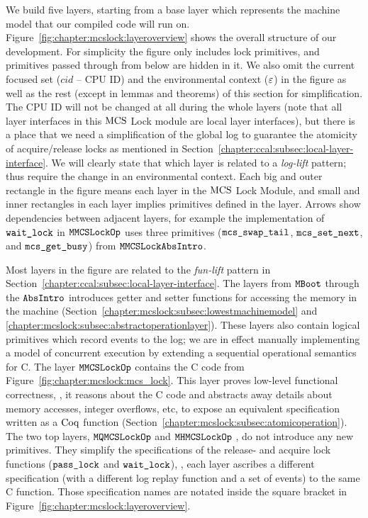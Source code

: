 We build five layers, starting from a base layer which represents the machine model that our compiled code will
run on.
Figure~\ref{fig:chapter:mcslock:layeroverview} shows the overall structure of our development.
For simplicity the figure only includes lock primitives, and
primitives passed through from below are hidden in it.
We also omit the current focused set ($cid$ -- CPU ID) and the environmental context (${\varepsilon}$) in the figure
 as well as the rest (except in lemmas and theorems) of this section for simplification.
The CPU ID will not be changed at all during the whole layers (note that all  layer interfaces in this $\mathrm{MCS}$ Lock module 
are local layer interfaces), but there is a place that we need a simplification of the global log to guarantee the atomicity of 
acquire/release locks as mentioned in Section~\ref{chapter:ccal:subsec:local-layer-interface}.
We will clearly state that which layer is related to a \textit{log-lift} pattern; 
thus require the change in an environmental context.
Each big and outer rectangle in the figure means each layer in the $\mathrm{MCS}$ Lock Module, 
and small and inner rectangles in each layer implies primitives defined in the layer.
Arrows show dependencies between adjacent layers,
for example the implementation of ${\mathrm{\texttt{wait\_lock}}}$ in  ${\mathrm{\texttt{MMCSLockOp}}}$
uses three primitives (${\mathrm{\texttt{mcs\_swap\_tail}}}$,
${\mathrm{\texttt{mcs\_set\_next}}}$, and ${\mathrm{\texttt{mcs\_get\_busy}}}$) from  ${\mathrm{\texttt{MMCSLockAbsIntro}}}$.

Most layers in the figure are related to the \textit{fun-lift} pattern in Section~\ref{chapter:ccal:subsec:local-layer-interface}.
The layers from  ${\mathrm{\texttt{MBoot}}}$  through the ${\mathrm{\texttt{AbsIntro}}}$
introduces getter and setter functions for accessing the memory in the machine
(Section~\ref{chapter:mcslock:subsec:lowestmachinemodel} and
\ref{chapter:mcslock:subsec:abstractoperationlayer}). These layers also
contain logical primitives which record events to the log; we are in
effect manually implementing a model of concurrent execution by
extending a sequential operational semantics for C. 
The layer ${\mathrm{\texttt{MMCSLockOp}}}$ contains the C code from 
Figure~\ref{fig:chapter:mcslock:mcs_lock}. This layer proves low-level
functional correctness, \ie, it reasons about the C code and
abstracts away details about memory accesses, integer overflows, etc,
to expose an equivalent specification written as a $\mathrm{Coq}$
function (Section~\ref{chapter:mcslock:subsec:atomicoperation}).
The two top layers, ${\mathrm{\texttt{MQMCSLockOp}}}$ and ${\mathrm{\texttt{MHMCSLockOp}}}$ , do not introduce any new primitives.
They simplify the specifications of 
the release- and acquire lock functions (${\mathrm{\texttt{pass\_lock}}}$ and
${\mathrm{\texttt{wait\_lock}}}$), \ie, each layer ascribes a different
specification (with a different log replay function and a set of events)
to the same C function. Those specification names are notated inside the square bracket in Figure~\ref{fig:chapter:mcslock:layeroverview}.

